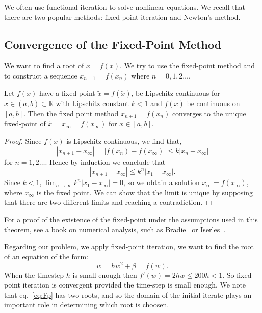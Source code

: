 We often use functional iteration to solve nonlinear equations. We recall that there are two popular methods: fixed-point iteration and Newton's method.

\subsection{Convergence of the Fixed-Point Method}

We want to find a root of $x=f(x).$ We try to use the fixed-point method and to construct a sequence $x_{n+1}=f(x_{n})$ where $n=0,1,2\ldots$.

\begin{theorem}
Let $f(x)$ have a fixed-point $\tilde{x}=f(\tilde{x})$, be Lipschitz continuous for $x\in(a, b)\subset\mathbb{R}$ with Lipschitz constant $k<1$ and $f(x)$ be continuous on $[a,b]$. Then the fixed point method $x_{n+1}=f(x_{n})$ converges to the unique fixed-point of $\tilde{x}=x_{\infty}=f(x_{\infty})$ for $x\in[a,b]$.
\end{theorem}

\begin{proof}
Since $f(x)$ is Lipschitz continuous, we find that, 
\begin{equation}
\left|x_{n+1}-x_{\infty}\right|=\left|f(x_{n})-f(x_{\infty})\right|\leq k\left|x_{n}-x_{\infty}\right|
\end{equation}
for $n=1,2\ldots$. Hence by induction we conclude that 
\begin{equation}
\left|x_{n+1}-x_{\infty}\right|\leq k^{n}\left|x_{1}-x_{\infty}\right|.
\end{equation}
Since $k<1$, $\lim_{n\rightarrow\infty}k^n\lvert x_1-x_{\infty}\rvert=0$, so we obtain a solution $x_{\infty}=f(x_{\infty})$, where $x_{\infty}$ is the fixed point. We can show that the limit is unique by supposing that there are two different limits and reaching a contradiction.\end{proof}

For a proof of the existence of the fixed-point under the assumptions used in this theorem, see a book on numerical analysis, such as Bradie~\cite{Bra06} or Iserles~\cite{Ise09}.

Regarding our problem, we apply fixed-point iteration, we want to find the root of an equation of the form:
\begin{equation}\label{eq:Fp}
w=hw^{2}+\beta=f(w). 
\end{equation}
When the timestep $h$ is small enough then $f'(w)=2hw\leq200h<1$. So fixed-point iteration is convergent provided the time-step is small enough. We note that eq.\ \eqref{eq:Fp} has two roots, and so the domain of the initial iterate plays an important role in determining which root is choosen.

